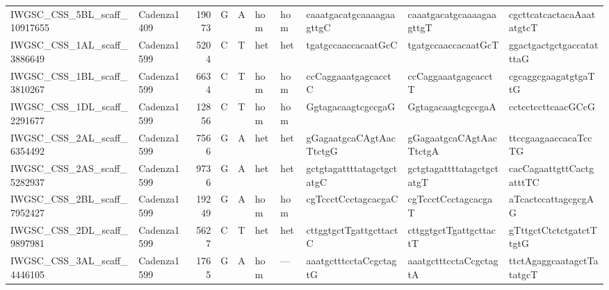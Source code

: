\begin{longtable}{llrlllllll}
 IWGSC\_CSS\_5BL\_scaff\_10917655 & Cadenza1409 &      19073 & G         & A        & hom            & hom         & caaatgacatgcaaaagaagttgC  & caaatgacatgcaaaagaagttgT  & cgcttcatcactacaAaatatgtcT \\
 IWGSC\_CSS\_1AL\_scaff\_3886649  & Cadenza1599 &       5204 & C         & T        & het            & het         & tgatgccaaccacaatGcC       & tgatgccaaccacaatGcT       & ggactgactgctgaccatatttaG  \\
 IWGSC\_CSS\_1BL\_scaff\_3810267  & Cadenza1599 &       6634 & C         & T        & hom            & hom         & ccCaggaaatgagcacctC       & ccCaggaaatgagcacctT       & cgcaggcgaagatgtgaTtG      \\
 IWGSC\_CSS\_1DL\_scaff\_2291677  & Cadenza1599 &      12856 & C         & T        & hom            & hom         & GgtagacaagtcgccgaG        & GgtagacaagtcgccgaA        & cctcctccttcaacGCcG        \\
 IWGSC\_CSS\_2AL\_scaff\_6354492  & Cadenza1599 &       7566 & G         & A        & het            & het         & gGagaatgcaCAgtAacTtctgG   & gGagaatgcaCAgtAacTtctgA   & ttccgaagaaccacaTccTG      \\
 IWGSC\_CSS\_2AS\_scaff\_5282937  & Cadenza1599 &       9736 & G         & A        & het            & het         & gctgtagattttatagctgctatgC & gctgtagattttatagctgctatgT & cacCagaattgttCactgatttTC  \\
 IWGSC\_CSS\_2BL\_scaff\_7952427  & Cadenza1599 &      19249 & G         & A        & hom            & hom         & cgTccctCcctagcacgaC       & cgTccctCcctagcacgaT       & aTcactccattagcgcgAG       \\
 IWGSC\_CSS\_2DL\_scaff\_9897981  & Cadenza1599 &       5627 & C         & T        & het            & het         & cttggtgctTgattgcttactC    & cttggtgctTgattgcttactT    & gTttgctCtctctgatctTtgtG   \\
 IWGSC\_CSS\_3AL\_scaff\_4446105  & Cadenza1599 &       1765 & G         & A        & hom            & ---         & aaatgctttcctaCcgctagtG    & aaatgctttcctaCcgctagtA    & ttctAgaggcaatagctTatatgcT \\
\end{longtable}
